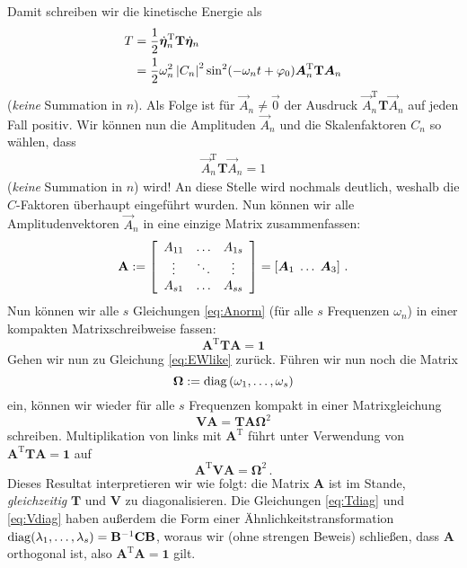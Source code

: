 \documentclass[paper=a4, fontsize=11.0pt, abstractoff, DIV12]{scrartcl}
\begin{document}
Damit schreiben wir die kinetische Energie als
\begin{align}
T &= \frac{1}{2}\dot{{\boldsymbol{\eta}}}_n^\mathrm{T} \mathbf{T} \dot{{\boldsymbol{\eta}}}_n\nonumber\\
&= \frac{1}{2} \omega_n^2 \left\vert C_n \right\vert^2 \sin^2(-\omega_n t +\varphi_0) {\boldsymbol{A}}^\mathrm{T}_n\mathbf{T}{\boldsymbol{A}}_n
\end{align}
(\emph{keine} Summation in $n$).
Als Folge ist für $\vec{A}_n \ne \vec 0$ der Ausdruck $\vec
A^\mathrm{T}_n\mathbf{T}\vec{A}_n$ auf jeden Fall positiv. Wir können nun
die Amplituden $\vec{A}_n$ und die Skalenfaktoren $C_n$ so wählen, dass
\begin{align}
\vec A^\mathrm{T}_n\mathbf{T}\vec{A}_n = 1
\label{eq:Anorm}
\end{align}
(\emph{keine} Summation in $n$) wird! An diese Stelle wird nochmals deutlich, weshalb die $C$-Faktoren
überhaupt eingeführt wurden. Nun können wir alle Amplitudenvektoren $\vec
A_n$ in eine einzige Matrix zusammenfassen:
\begin{equation}
\mathbf{A} := \threeMatrix{A_{11}}{\dots}{A_{1s}}{\vdots}{\ddots}{\vdots}{A_{s1}}{\dots}{A_{ss}} = \left[\vec A_1\; \dots\;\vec A_3\right]\,.
\end{equation}
Nun können wir alle $s$ Gleichungen \eqref{eq:Anorm} (für alle $s$ Frequenzen
$\omega_n$) in einer kompakten Matrixschreibweise fassen:
\begin{equation}
\mathbf{A}^\mathrm{T} \mathbf{T} \mathbf{A} = \mathbf{1}
\label{eq:Tdiag}
\end{equation}
Gehen wir nun zu Gleichung \eqref{eq:EWlike} zurück. Führen wir nun noch die
Matrix
\begin{equation}
\mathbf{\Omega} := \operatorname{diag}\left(\omega_1, \dots,\omega_s\right)
\end{equation}
ein, können wir wieder für alle $s$ Frequenzen kompakt in einer Matrixgleichung
\begin{equation}
\mathbf{V}\mathbf{A} = \mathbf{T}\mathbf{A}\mathbf{\Omega}^2
\end{equation}
schreiben. Multiplikation von links mit $\mathbf{A}^\mathrm{T}$ führt
unter Verwendung von $\mathbf{A}^\mathrm{T}\mathbf{T}\mathbf{A}=\mathbf{1}$ auf
\begin{equation}
\mathbf{A}^\mathrm{T}\mathbf{V}\mathbf{A} = \mathbf{\Omega}^2\,.
\label{eq:Vdiag}
\end{equation}
Dieses Resultat interpretieren wir wie folgt: die Matrix $\mathbf{A}$ ist im Stande,
\emph{gleichzeitig} $\mathbf{T}$ und $\mathbf{V}$ zu diagonalisieren. Die
Gleichungen \eqref{eq:Tdiag} und \eqref{eq:Vdiag} haben außerdem die Form einer
Ähn\-lich\-keits\-trans\-for\-mation $\operatorname{diag}(\lambda_1,\dots,\lambda_s) = \mathbf{B}^{-1}\mathbf{C}\mathbf{B}$,
woraus wir (ohne strengen Beweis) schließen, dass $\mathbf{A}$ orthogonal ist, also
$\mathbf{A}^\mathrm{T}\mathbf{A}=\mathbf{1}$ gilt.
\end{document}
